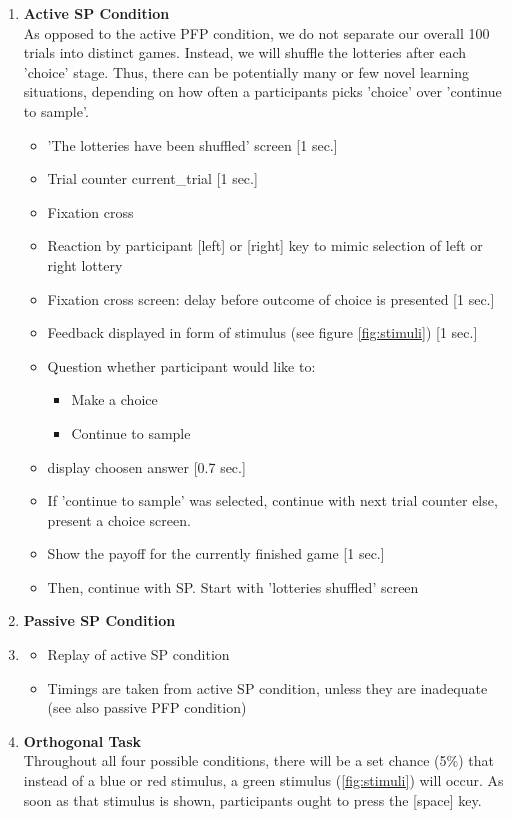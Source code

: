 \documentclass[
	12pt,
	oneside,
	bibliography=totocnumbered]{scrartcl}
\begin{document}
\begin{enumerate}
\item \textbf{Active SP Condition} \\
As opposed to the active PFP condition, we do not separate our overall 100 trials into distinct games. Instead, we will shuffle the lotteries after each 'choice' stage. Thus, there can be potentially many or few novel learning situations, depending on how often a participants picks 'choice' over 'continue to sample'.
\begin{itemize}
\item 'The lotteries have been shuffled' screen  [1 sec.]
\item Trial counter current\_trial [1 sec.]
\item Fixation cross 
\item Reaction by participant [left] or [right] key to mimic selection of left or right lottery
\item Fixation cross screen: delay before outcome of choice is presented [1 sec.]
\item Feedback displayed in form of stimulus (see figure \ref{fig:stimuli}) [1 sec.]
\item Question whether participant would like to: 
\begin{itemize}
\item Make a choice
\item Continue to sample
\end{itemize}
\item display choosen answer [0.7 sec.]
\item If 'continue to sample' was selected, continue with next trial counter else, present a choice screen.
\item Show the payoff for the currently finished game [1 sec.]
\item Then, continue with SP. Start with 'lotteries shuffled' screen
\end{itemize}
\item \textbf{Passive SP Condition} \\\item
\begin{itemize}
\item Replay of active SP condition
\item Timings are taken from active SP condition, unless they are inadequate (see also passive PFP condition)
\end{itemize}


\item \textbf{Orthogonal Task} \\
Throughout all four possible conditions, there will be a set chance (5\%) that instead of a blue or red stimulus, a green stimulus (\ref{fig:stimuli}) will occur. As soon as that stimulus is shown, participants ought to press the [space] key.
\end{enumerate} 
\end{document}

